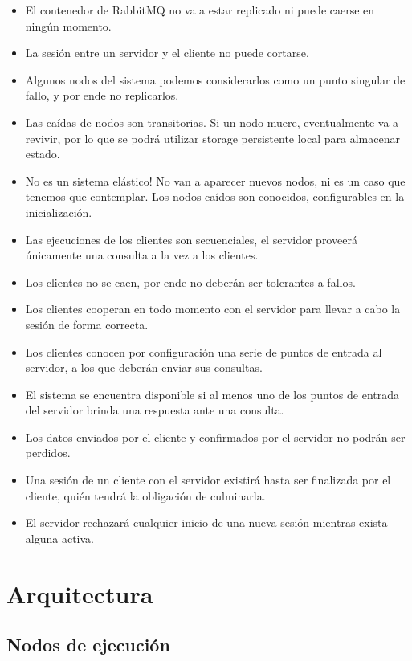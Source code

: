 \documentclass[titlepage,a4paper,oneside]{article}
\begin{document}
\begin{itemize}
\item El contenedor de RabbitMQ no va a estar replicado ni puede caerse en ningún momento.
\item La sesión entre un servidor y el cliente no puede cortarse.
\item Algunos nodos del sistema podemos considerarlos como un punto singular de fallo, y por ende no replicarlos.
\item Las caídas de nodos son transitorias. Si un nodo muere, eventualmente va a revivir, por lo que se podrá utilizar storage persistente local para almacenar estado.
\item No es un sistema elástico! No van a aparecer nuevos nodos, ni es un caso que tenemos que contemplar. Los nodos caídos son conocidos, configurables en la inicialización.
\item Las ejecuciones de los clientes son secuenciales, el servidor proveerá únicamente una consulta a la vez a los clientes.
\item Los clientes no se caen, por ende no deberán ser tolerantes a fallos.
\item Los clientes cooperan en todo momento con el servidor para llevar a cabo la sesión de forma correcta.
\item Los clientes conocen por configuración una serie de puntos de entrada al servidor, a los que deberán enviar sus consultas.
\item El sistema se encuentra disponible si al menos uno de los puntos de entrada del servidor brinda una respuesta ante una consulta.
\item Los datos enviados por el cliente y confirmados por el servidor no podrán ser perdidos.
\item Una sesión de un cliente con el servidor existirá hasta ser finalizada por el cliente, quién tendrá la obligación de culminarla.
\item El servidor rechazará cualquier inicio de una nueva sesión mientras exista alguna activa.
\end{itemize}

\section{Arquitectura}

\subsection{Nodos de ejecución}
\end{document}
